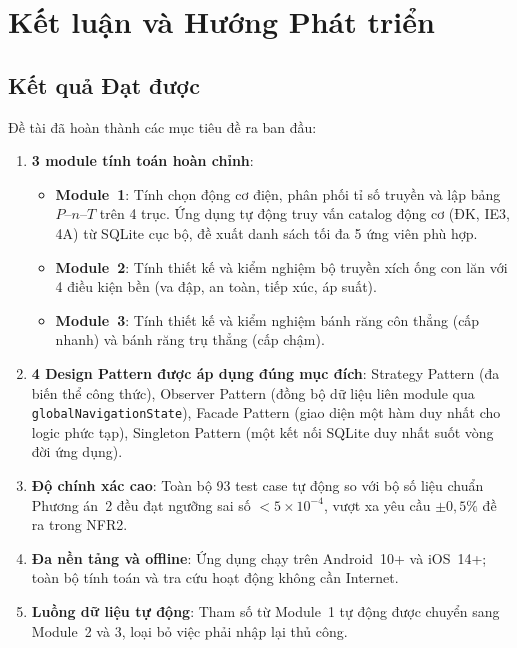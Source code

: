 \chapter{Kết luận và Hướng Phát triển}
\label{chap:conclusion}

\section{Kết quả Đạt được}
\label{sec:conclusion-results}

Đề tài đã hoàn thành các mục tiêu đề ra ban đầu:

\begin{enumerate}
  \item \textbf{3 module tính toán hoàn chỉnh}:
    \begin{itemize}
      \item \textbf{Module~1}: Tính chọn động cơ điện, phân phối tỉ số truyền
            và lập bảng $P$--$n$--$T$ trên 4 trục.
            Ứng dụng tự động truy vấn catalog động cơ (ĐK, IE3, 4A) từ SQLite cục bộ,
            đề xuất danh sách tối đa 5 ứng viên phù hợp.
      \item \textbf{Module~2}: Tính thiết kế và kiểm nghiệm bộ truyền xích ống con lăn
            với 4 điều kiện bền (va đập, an toàn, tiếp xúc, áp suất).
      \item \textbf{Module~3}: Tính thiết kế và kiểm nghiệm bánh răng côn thẳng
            (cấp nhanh) và bánh răng trụ thẳng (cấp chậm).
    \end{itemize}

  \item \textbf{4 Design Pattern được áp dụng đúng mục đích}:
    Strategy Pattern (đa biến thể công thức),
    Observer Pattern (đồng bộ dữ liệu liên module qua \texttt{globalNavigationState}),
    Facade Pattern (giao diện một hàm duy nhất cho logic phức tạp),
    Singleton Pattern (một kết nối SQLite duy nhất suốt vòng đời ứng dụng).

  \item \textbf{Độ chính xác cao}:
        Toàn bộ 93 test case tự động so với bộ số liệu chuẩn Phương án~2
        đều đạt ngưỡng sai số $< 5 \times 10^{-4}$,
        vượt xa yêu cầu $\pm 0{,}5\%$ đề ra trong NFR2.

  \item \textbf{Đa nền tảng và offline}: Ứng dụng chạy trên Android~10+
        và iOS~14+; toàn bộ tính toán và tra cứu hoạt động không cần Internet.

  \item \textbf{Luồng dữ liệu tự động}: Tham số từ Module~1 tự động được
        chuyển sang Module~2 và 3, loại bỏ việc phải nhập lại thủ công.
\end{enumerate}

